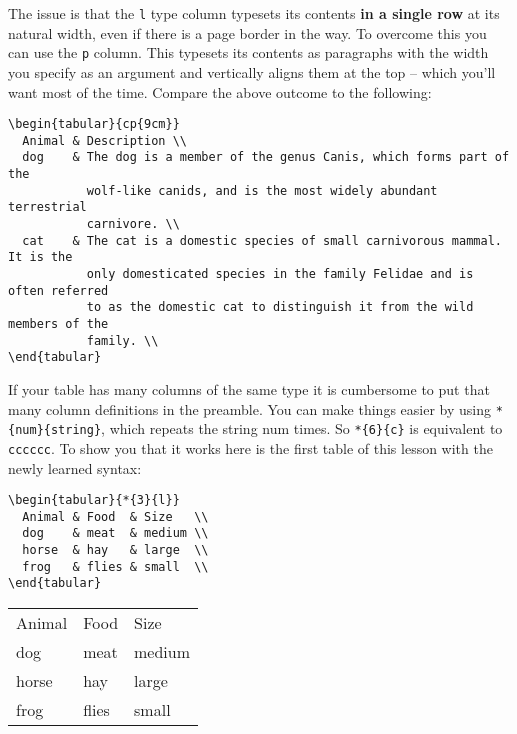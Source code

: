 \documentclass{article}
\begin{document}
The issue is that the \texttt{l} type column typesets its contents \textbf{in a single row} at its natural width, even if there is a page border in the way. To overcome this you can use the \texttt{p} column. This typesets its contents as paragraphs with the width you specify as an argument and vertically aligns them at the top – which you’ll want most of the time. Compare the above outcome to the following:

\begin{verbatim}
\begin{tabular}{cp{9cm}}
  Animal & Description \\
  dog    & The dog is a member of the genus Canis, which forms part of the
           wolf-like canids, and is the most widely abundant terrestrial
           carnivore. \\
  cat    & The cat is a domestic species of small carnivorous mammal. It is the
           only domesticated species in the family Felidae and is often referred
           to as the domestic cat to distinguish it from the wild members of the
           family. \\
\end{tabular}
\end{verbatim}

If your table has many columns of the same type it is cumbersome to put that many column definitions in the preamble. You can make things easier by using \verb|*{num}{string}|, which repeats the string num times. So \verb|*{6}{c}| is equivalent to \verb|cccccc|. To show you that it works here is the first table of this lesson with the newly learned syntax:

\begin{verbatim}
\begin{tabular}{*{3}{l}}
  Animal & Food  & Size   \\
  dog    & meat  & medium \\
  horse  & hay   & large  \\
  frog   & flies & small  \\
\end{tabular}
\end{verbatim}

\begin{tabular}{*{3}{l}}
  Animal & Food  & Size   \\
  dog    & meat  & medium \\
  horse  & hay   & large  \\
  frog   & flies & small  \\
\end{tabular}
\end{document}
